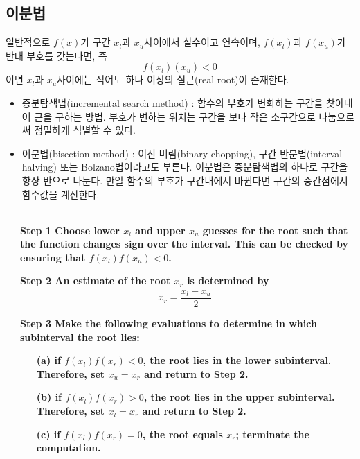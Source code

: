 \clearpage
\subsection{이분법}
일반적으로 $f(x)$가 구간 $x_l$과 $x_u$사이에서 실수이고 연속이며, $f(x_{l})$과 $f(x_{u})$가 반대 부호를 갖는다면, 즉
\begin{equation}
f(x_{l})(x_{u})<0
\end{equation}
이면 $x_{l}$과 $x_{u}$사이에는 적어도 하나 이상의 실근(real root)이 존재한다.
\begin{itemize}
\item 증분탐색법(incremental search method) : 함수의 부호가 변화하는 구간을 찾아내어 근을 구하는 방법. 부호가 변하는 위치는 구간을 보다 작은 소구간으로 나눔으로써 정밀하게 식별할 수 있다.
\item 이분법(bisection method) : 이진 버림(binary chopping), 구간 반분법(interval halving) 또는 Bolzano법이라고도 부른다. 이분법은 증분탐색법의 하나로 구간을 항상 반으로 나눈다. 만일 함수의 부호가 구간내에서 바뀐다면 구간의 중간점에서 함수값을 계산한다.
\end{itemize}
\begin{tabular}[t]{|i{0.001cm}e{0.9\textwidth}|}
\hline
  \item[]
  \item[]
  \item[]&
  \item[\textbf{Step 1}] Choose lower $x_{l}$ and upper $x_{u}$ guesses for the root such that the function changes sign over the interval. This can be checked by ensuring that $f(x_{l})f(x_{u})<0$.
  \item[\textbf{Step 2}]  An estimate of the root $x_{r}$ is determined by
\begin{displaymath}
x_{r}=\frac{x_{l}+x_{u}}{2}
\end{displaymath}
  \item[\textbf{Step 3}] Make the following evaluations to determine in which subinterval the root lies:
  \begin{itemize}
  \item[(a)] if $f(x_{l})f(x_{r})<0$, the root lies in the lower subinterval. Therefore, set $x_{u}=x_{r}$ and return to \textbf{Step 2}.
  \item[(b)] if $f(x_{l})f(x_{r})>0$, the root lies in the upper subinterval. Therefore, set $x_{l}=x_{r}$ and return to \textbf{Step 2}.
  \item[(c)] if $f(x_{l})f(x_{r})=0$, the root equals $x_{r}$; terminate the computation.
  \end{itemize}
\\\hline
\end{tabular}

